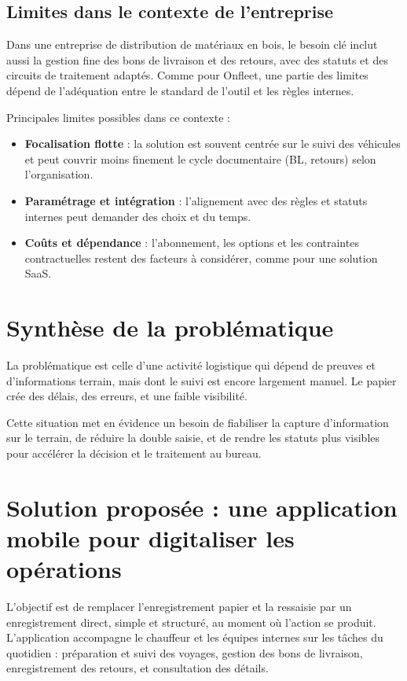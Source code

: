 \documentclass[12pt,a4paper]{article}
\begin{document}
    \subsection*{Limites dans le contexte de l'entreprise}
    Dans une entreprise de distribution de matériaux en bois, le besoin clé inclut aussi la gestion fine des bons de livraison et des retours, avec des statuts et des circuits de traitement adaptés. Comme pour Onfleet, une partie des limites dépend de l'adéquation entre le standard de l'outil et les règles internes.

    Principales limites possibles dans ce contexte :
    \begin{itemize}[leftmargin=1.2em]
    \item \textbf{Focalisation flotte} : la solution est souvent centrée sur le suivi des véhicules et peut couvrir moins finement le cycle documentaire (BL, retours) selon l'organisation.
    \item \textbf{Paramétrage et intégration} : l'alignement avec des règles et statuts internes peut demander des choix et du temps.
    \item \textbf{Coûts et dépendance} : l'abonnement, les options et les contraintes contractuelles restent des facteurs à considérer, comme pour une solution SaaS.
    \end{itemize}

    \section*{Synthèse de la problématique}
    La problématique est celle d'une activité logistique qui dépend de preuves et d'informations terrain, mais dont le suivi est encore largement manuel. Le papier crée des délais, des erreurs, et une faible visibilité.

    Cette situation met en évidence un besoin de fiabiliser la capture d'information sur le terrain, de réduire la double saisie, et de rendre les statuts plus visibles pour accélérer la décision et le traitement au bureau.

    \newpage

    \section*{Solution proposée : une application mobile pour digitaliser les opérations}
    L'objectif est de remplacer l'enregistrement papier et la ressaisie par un enregistrement direct, simple et structuré, au moment où l'action se produit. L'application accompagne le chauffeur et les équipes internes sur les tâches du quotidien : préparation et suivi des voyages, gestion des bons de livraison, enregistrement des retours, et consultation des détails.
\end{document}
